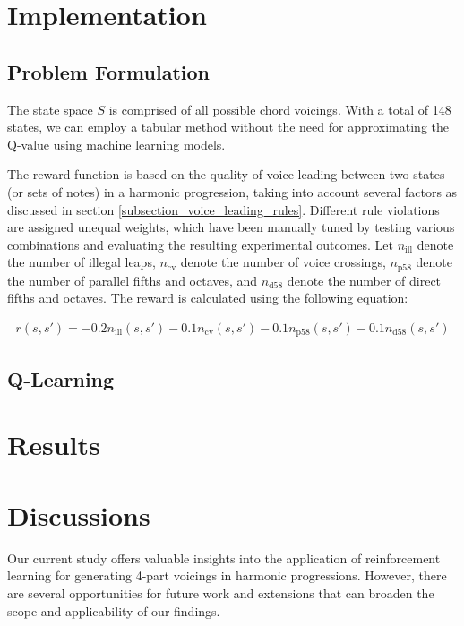 \documentclass[12pt, letterpaper]{article}
\begin{document}
\section{Implementation}

\subsection{Problem Formulation}

The state space $S$ is comprised of all possible chord voicings. With a total of 148 states, we can employ a tabular method without the need for approximating the Q-value using machine learning models.

The reward function is based on the quality of voice leading between two states (or sets of notes) in a harmonic progression, taking into account several factors as discussed in section \ref{subsection_voice_leading_rules}. Different rule violations are assigned unequal weights, which have been manually tuned by testing various combinations and evaluating the resulting experimental outcomes. Let $n_\text{ill}$ denote the number of illegal leaps, $n_\text{cv}$ denote the number of voice crossings, $n_\text{p58}$ denote the number of parallel fifths and octaves, and $n_\text{d58}$ denote the number of direct fifths and octaves. The reward is calculated using the following equation:

\begin{align}
    r(s, s') = -0.2n_\text{ill}(s, s') - 0.1n_\text{cv}(s, s') - 0.1n_\text{p58}(s, s') -0.1n_\text{d58}(s, s')
\end{align}

\subsection{Q-Learning}

\section{Results}

\section{Discussions}

Our current study offers valuable insights into the application of reinforcement learning for generating 4-part voicings in harmonic progressions. However, there are several opportunities for future work and extensions that can broaden the scope and applicability of our findings.
\end{document}
